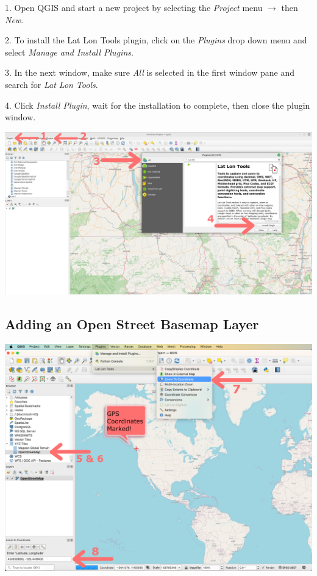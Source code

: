 \documentclass[oneside,a4paper,11pt,explicit]{book}
\begin{document}
	1. Open QGIS and start a new project by selecting the \textit{Project} menu $\rightarrow$ then \textit{New}. 
	
	2. To install the Lat Lon Tools plugin, click on the \textit{Plugins} drop down menu and select \textit{Manage and Install Plugins}.
	
	3. In the next window, make sure \textit{All} is selected in the first window pane and search for \textit{Lat Lon Tools}.
	
	4. Click \textit{Install Plugin}, wait for the installation to complete, then close the plugin window.
	
	\centerline{\includegraphics[width=\textwidth]{LatLonTools.png}}
	
	\subsection{Adding an Open Street Basemap Layer}
	
	\centerline{\includegraphics[width=.9\textwidth]{QGISbasemap.png}}
	
\end{document}
